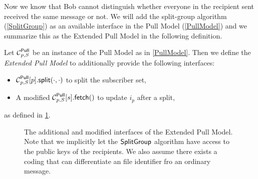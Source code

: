 Now we know that Bob cannot distinguish whether everyone in the recipient sent 
received the same message or not.
We will add the split-group algorithm (\cref{SplitGroup}) as an available 
interface in the Pull Model (\cref{PullModel}) and we summarize this as the 
Extended Pull Model in the following definition.

\begin{definition}\label{ExtPullModel}
  Let \(\Pull[p, S]\) be an instance of the Pull Model as in \cref{PullModel}.
  Then we define the \emph{Extended Pull Model} to additionally provide the 
  following interfaces:
  \begin{itemize}
    \item \(\psplit[p, S]{p}[\cdot, \cdot]\) to split the subscriber set,
    \item A modified \(\pget[p, S]{s}[]\) to update \(i_p\) after a split,
  \end{itemize}
  as defined in \cref{ExtPullFunctions}.
\end{definition}

\begin{figure}
  \caption{%
    The additional and modified interfaces of the Extended Pull Model.
    Note that we implicitly let the \(\SplitGroup\) algorithm have access to 
    the public keys of the recipients.
    We also assume there exists a coding that can differentiate an file 
    identifier fro an ordinary message.
  }\label{ExtPullFunctions}
\end{figure}

